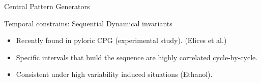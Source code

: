 \documentclass[aspectratio=43]{beamer}
\begin{document}
\begin{frame}{Central Pattern Generators}
{		%
		\begin{figure}[h!]
			\centering
		\end{figure}		
	}
\end{frame}

\begin{frame}{Temporal constrains: Sequential Dynamical invariants}

		\begin{itemize}
			\item<1->Recently found in pyloric CPG (experimental study). (Elices et al.)
			\item<1->Specific intervals that build the sequence are highly correlated cycle-by-cycle.
			\item<1->Consistent under high variability induced situations (Ethanol).
		\end{itemize}
	\begin{figure}[h!]
		\centering
	\end{figure}
\end{frame}
\end{document}

